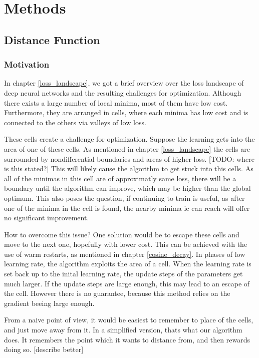 \chapter{Methods}
\section{Distance Function}
\subsection{Motivation}
In chapter \ref{loss_landscape}, we got a brief overview over the loss landscape
of deep neural networks and the resulting challenges for optimization. Although
there exists a large number of local minima, most of them have low cost.
Furthermore, they are arranged in cells, where each minima has low cost and is
connected to the others via valleys of low loss.

These cells create a challenge for optimization. Suppose the learning gets into
the area of one of these cells. As mentioned in chapter \ref{loss_landscape} the
cells are surrounded by nondifferential boundaries and areas of higher loss.
[TODO: where is this stated?] This will likely cause the algorithm to get stuck
into this cells. As all of the minimas in this cell are of approximatly same
loss, there will be a boundary until the algorithm can improve, which may be
higher than the global optimum. This also poses the question, if continuing to
train is useful, as after one of the minima in the cell is found, the nearby
minima ic can reach will offer no significant improvement.

How to overcome this issue? One solution would be to escape these cells and move
to the next one, hopefully with lower cost. This can be achieved with the use of
warm restarts, as mentioned in chapter \ref{cosine_decay}. In phases of low
learning rate, the algorithm exploits the area of a cell. When the learning rate
is set back up to the inital learning rate, the update steps of the parameters
get much larger. If the update steps are large enough, this may lead to an
escape of the cell. However there is no guarantee, because this method relies on
the gradient beeing large enough.

From a naive point of view, it would be easiest to remember to place of the
cells, and just move away from it. In a simplified version, thats what our
algorithm does. It remembers the point which it wants to distance from, and then
rewards doing so. [describe better]
 
